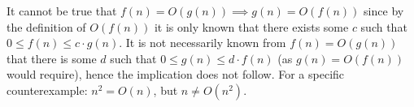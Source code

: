 It cannot be true that $ f(n) = O(g(n)) \implies g(n) = O(f(n)) $ since by the definition of $ O(f(n)) $ it is only known that there exists some $ c $ such that $ 0 \leq f(n) \leq c \cdot g(n) $. It is not necessarily known from $ f(n) = O(g(n)) $ that there is some $ d $ such that $ 0 \leq g(n) \leq d \cdot f(n) $ (as $ g(n) = O(f(n)) $ would require), hence the implication does not follow. For a specific counterexample: $ n^2 = O(n) $, but $ n \neq O(n^2) $.